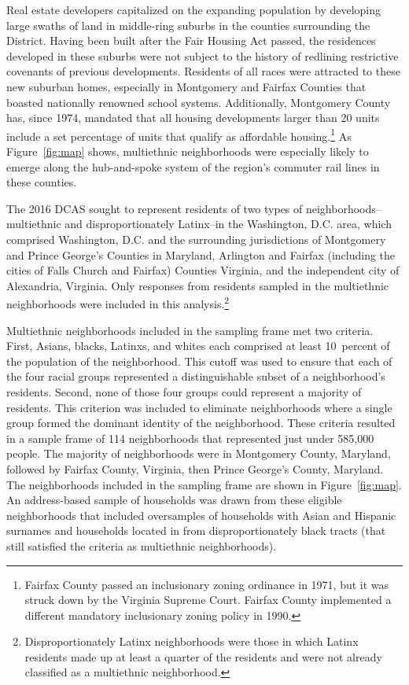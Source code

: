 \documentclass{baderart}
\begin{document}
Real estate developers capitalized on the expanding population by developing large swaths of land in middle-ring suburbs in the counties surrounding the District. Having been built after the Fair Housing Act passed, the residences developed in these suburbs were not subject to the history of redlining restrictive covenants of previous developments. Residents of all races were attracted to these new suburban homes, especially in Montgomery and Fairfax Counties that boasted nationally renowned school systems. Additionally, Montgomery County has, since 1974, mandated that all housing developments larger than 20 units include a set percentage of units that qualify as affordable housing.\footnote{Fairfax County passed an inclusionary   zoning ordinance in 1971, but it was struck down by the Virginia   Supreme Court. Fairfax County implemented a different mandatory   inclusionary zoning policy in 1990.} As Figure~\ref{fig:map} shows, multiethnic neighborhoods were especially likely to emerge along the hub-and-spoke system of the region's commuter rail lines in these counties.


The 2016 DCAS sought to represent residents of two types of neighborhoods--multiethnic and disproportionately Latinx--in the Washington, D.C. area, which comprised Washington, D.C. and the surrounding jurisdictions of Montgomery and Prince George's Counties in Maryland, Arlington and Fairfax (including the cities of Falls Church and Fairfax) Counties Virginia, and the independent city of Alexandria, Virginia. Only responses from residents sampled in the multiethnic neighborhoods were included in this analysis.\footnote{Disproportionately   Latinx neighborhoods were those in which Latinx residents made up at   least a quarter of the residents and were not already classified as a   multiethnic neighborhood.}

Multiethnic neighborhoods included in the sampling frame met two criteria. First, Asians, blacks, Latinxs, and whites each comprised at least 10~percent of the population of the neighborhood. This cutoff was used to ensure that each of the four racial groups represented a distinguishable subset of a neighborhood's residents. Second, none of those four groups could represent a majority of residents. This criterion was included to eliminate neighborhoods where a single group formed the dominant identity of the neighborhood. These criteria resulted in a sample frame of 114 neighborhoods that represented just under 585,000 people. The majority of neighborhoods were in Montgomery County, Maryland, followed by Fairfax County, Virginia, then Prince George's County, Maryland. The neighborhoods included in the sampling frame are shown in Figure~\ref{fig:map}. An address-based sample of households was drawn from these eligible neighborhoods that included oversamples of households with Asian and Hispanic surnames and households located in from disproportionately black tracts (that still satisfied the criteria as multiethnic neighborhoods).
\end{document}
